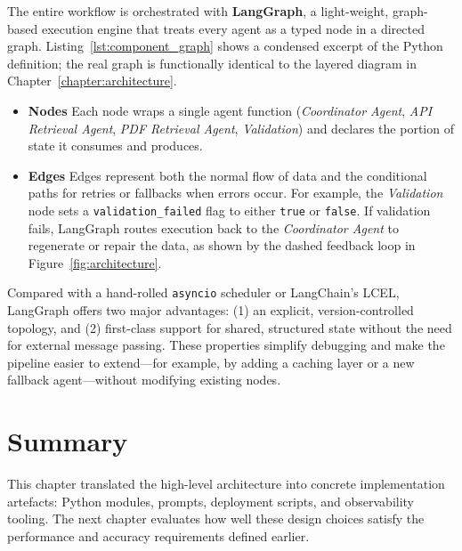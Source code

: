 The entire workflow is orchestrated with \textbf{LangGraph}, a light-weight, graph-based execution engine that treats every agent as a typed node in a directed graph.  Listing~\ref{lst:component_graph} shows a condensed excerpt of the Python definition; the real graph is functionally identical to the layered diagram in Chapter~\ref{chapter:architecture}.
\begin{itemize}
  \item \textbf{Nodes} \quad Each node wraps a single agent function (\emph{Coordinator Agent}, \emph{API Retrieval Agent}, \emph{PDF Retrieval Agent}, \emph{Validation}) and declares the portion of state it consumes and produces.
  \item \textbf{Edges} \quad Edges represent both the normal flow of data and the conditional paths for retries or fallbacks when errors occur. For example, the \emph{Validation} node sets a \verb|validation_failed| flag to either \texttt{true} or \texttt{false}. If validation fails, LangGraph routes execution back to the \emph{Coordinator Agent} to regenerate or repair the data, as shown by the dashed feedback loop in Figure~\ref{fig:architecture}.
\end{itemize}

Compared with a hand-rolled \texttt{asyncio} scheduler or LangChain's LCEL, LangGraph offers two major advantages: (1) an explicit, version-controlled topology, and (2) first-class support for shared, structured state without the need for external message passing. These properties simplify debugging and make the pipeline easier to extend—for example, by adding a caching layer or a new fallback agent—without modifying existing nodes.

\section{Summary}

This chapter translated the high-level architecture into concrete implementation artefacts: Python modules, prompts, deployment scripts, and observability tooling.  The next chapter evaluates how well these design choices satisfy the performance and accuracy requirements defined earlier.